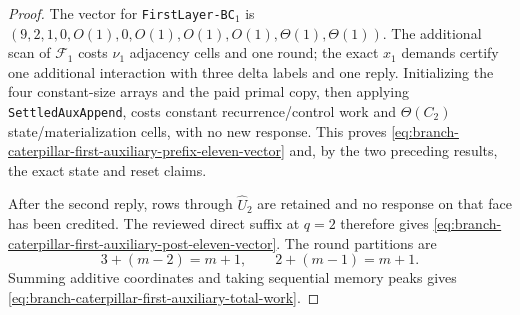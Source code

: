 
\begin{proof}
The vector for \texttt{FirstLayer-BC}$_1$ is
$(9,2,1,0,O(1),0,O(1),O(1),O(1),\Theta(1),\Theta(1))$.
The additional scan of $\mathcal F_1$ costs $\nu_1$ adjacency cells and one
round; the exact $x_1$ demands certify one additional interaction with three
delta labels and one reply.  Initializing the four constant-size arrays and
the paid primal copy, then applying \texttt{SettledAuxAppend}, costs constant
recurrence/control work and $\Theta(C_2)$ state/materialization cells, with no
new response.  This proves
\cref{eq:branch-caterpillar-first-auxiliary-prefix-eleven-vector} and, by the
two preceding results, the exact state and reset claims.

After the second reply, rows through $\widehat U_2$ are retained and no
response on that face has been credited.  The reviewed direct suffix at
$q=2$ therefore gives
\cref{eq:branch-caterpillar-first-auxiliary-post-eleven-vector}.  The round
partitions are
\[
 3+(m-2)=m+1,
 \qquad
 2+(m-1)=m+1.
\]
Summing additive coordinates and taking sequential memory peaks gives
\cref{eq:branch-caterpillar-first-auxiliary-total-work}.
\end{proof}
